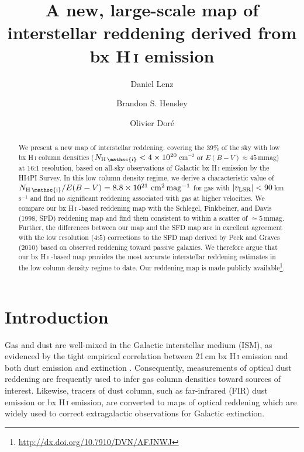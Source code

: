 \documentclass[iop,apj]{emulateapj}
\makeatletter
\def\testbx{bx}%
\DeclareRobustCommand{\ion}[2]{%
\relax\ifmmode
\ifx\testbx\f@series
{\mathbf{#1\,\mathsc{#2}}}\else
{\mathrm{#1\,\mathsc{#2}}}\fi
\else\textup{#1\,{\mdseries\textsc{#2}}}%
\fi}
\makeatother
\begin{document}
\title{A new, large-scale map of interstellar reddening derived from \ion{H}{i} emission}

\author{Daniel Lenz}
\author{Brandon S. Hensley}
\author{Olivier Dor\'e}


\begin{abstract}
We present a new map of interstellar reddening, covering the 39\% of the sky with low \ion{H}{i} column densities ($N_\ion{H}{i} < 4\times10^{20}\,$cm$^{-2}$ or $E(B-V)\approx 45$\,mmag) at $16\overset{'}{.}1$ resolution, based on all-sky observations of Galactic \ion{H}{i} emission by the HI4PI Survey. In this low column density regime, we derive a characteristic value of $N_\ion{H}{i}/E(B-V) = 8.8\times10^{21}\,\rm\,cm^{2}\,mag^{-1}$ for gas with $|v_{\rm LSR}| < 90$\,km\,s$^{-1}$ and find no significant reddening associated with gas at higher velocities. We compare our \ion{H}{i}-based reddening map with the Schlegel, Finkbeiner, and Davis (1998, SFD) reddening map and find them consistent to within a scatter of $\simeq 5$\,mmag. Further, the differences between our map and the SFD map are in excellent agreement with the low resolution ($4\overset{\circ}{.}5$) corrections to the SFD map derived by Peek and Graves (2010) based on observed reddening toward passive galaxies. We therefore argue that our \ion{H}{i}-based map provides the most accurate interstellar reddening estimates in the low column density regime to date.
Our reddening map is made publicly available\footnote{\url{http://dx.doi.org/10.7910/DVN/AFJNWJ}}. 
\end{abstract}


\section{Introduction}
Gas and dust are well-mixed in the Galactic interstellar medium (ISM), as evidenced by the tight empirical correlation between 21\,cm \ion{H}{i} emission and both dust emission \citep[e.g.,][]{Low+etal_1984, Boulanger+etal_1996} and extinction \citep[e.g.,][]{Sturch_1969, Bohlin+Savage+Drake_1978}. Consequently, measurements of optical dust reddening are frequently used to infer gas column densities toward sources of interest. Likewise, tracers of dust column, such as far-infrared (FIR) dust emission or \ion{H}{i} emission, are converted to maps of optical reddening which are widely used to correct extragalactic observations for Galactic extinction.
\end{document}
